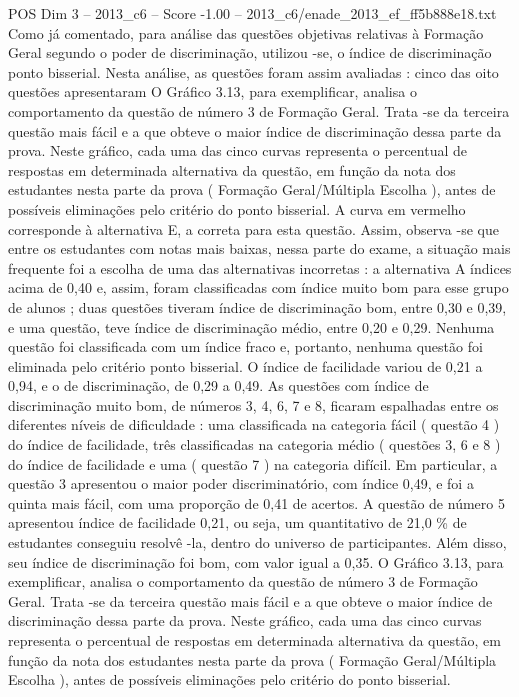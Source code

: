 \begin{textsample}{POS Dim 3 – 2013\_c6 – Score -1.00 – 2013\_c6/enade\_2013\_ef\_ff5b888e18.txt}
Como já comentado, para análise das questões objetivas relativas à Formação Geral segundo o poder de discriminação, utilizou -se, o índice de discriminação ponto bisserial.
Nesta análise, as questões foram assim avaliadas : cinco das oito questões apresentaram O Gráfico 3.13, para exemplificar, analisa o comportamento da questão de número 3 de Formação Geral.
Trata -se da terceira questão mais fácil e a que obteve o maior índice de discriminação dessa parte da prova.
Neste gráfico, cada uma das cinco curvas representa o percentual de respostas em determinada alternativa da questão, em função da nota dos estudantes nesta parte da prova ( Formação Geral/Múltipla Escolha ), antes de possíveis eliminações pelo critério do ponto bisserial.
A curva em vermelho corresponde à alternativa E, a correta para esta questão.
Assim, observa -se que entre os estudantes com notas mais baixas, nessa parte do exame, a situação mais frequente foi a escolha de uma das alternativas incorretas : a alternativa A índices acima de 0,40 e, assim, foram classificadas com índice muito bom para esse grupo de alunos ; duas questões tiveram índice de discriminação bom, entre 0,30 e 0,39, e uma questão, teve índice de discriminação médio, entre 0,20 e 0,29.
Nenhuma questão foi classificada com um índice fraco e, portanto, nenhuma questão foi eliminada pelo critério ponto bisserial.
O índice de facilidade variou de 0,21 a 0,94, e o de discriminação, de 0,29 a 0,49.
As questões com índice de discriminação muito bom, de números 3, 4, 6, 7 e 8, ficaram espalhadas entre os diferentes níveis de dificuldade : uma classificada na categoria fácil ( questão 4 ) do índice de facilidade, três classificadas na categoria médio ( questões 3, 6 e 8 ) do índice de facilidade e uma ( questão 7 ) na categoria difícil.
Em particular, a questão 3 apresentou o maior poder discriminatório, com índice 0,49, e foi a quinta mais fácil, com uma proporção de 0,41 de acertos.
A questão de número 5 apresentou índice de facilidade 0,21, ou seja, um quantitativo de 21,0 \% de estudantes conseguiu resolvê -la, dentro do universo de participantes.
Além disso, seu índice de discriminação foi bom, com valor igual a 0,35.
O Gráfico 3.13, para exemplificar, analisa o comportamento da questão de número 3 de Formação Geral.
Trata -se da terceira questão mais fácil e a que obteve o maior índice de discriminação dessa parte da prova.
Neste gráfico, cada uma das cinco curvas representa o percentual de respostas em determinada alternativa da questão, em função da nota dos estudantes nesta parte da prova ( Formação Geral/Múltipla Escolha ), antes de possíveis eliminações pelo critério do ponto bisserial.

\end{textsample}
